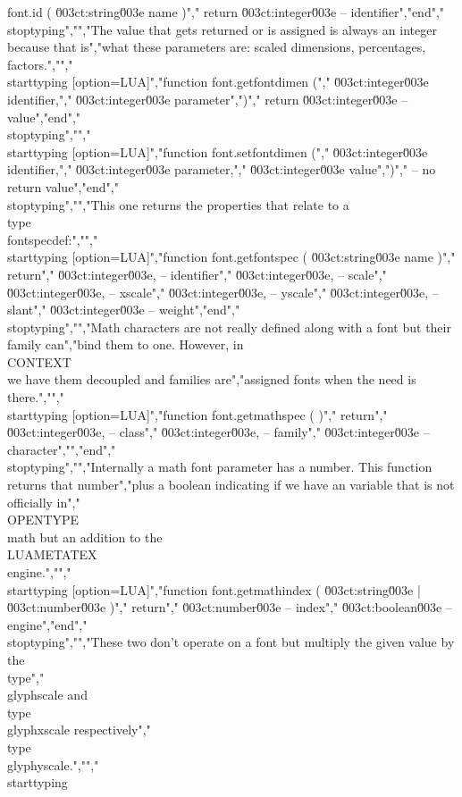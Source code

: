 font.id ( \u003ct:string\u003e name )","    return \u003ct:integer\u003e -- identifier","end","\\stoptyping","","The value that gets returned or is assigned is always an integer because that is","what these parameters are: scaled dimensions, percentages, factors.","","\\starttyping [option=LUA]","function font.getfontdimen (","    \u003ct:integer\u003e identifier,","    \u003ct:integer\u003e parameter",")","    return \u003ct:integer\u003e -- value","end","\\stoptyping","","\\starttyping [option=LUA]","function font.setfontdimen (","    \u003ct:integer\u003e identifier,","    \u003ct:integer\u003e parameter,","    \u003ct:integer\u003e value",")","    -- no return value","end","\\stoptyping","","This one returns the properties that relate to a \\type {\\fontspecdef}:","","\\starttyping [option=LUA]","function font.getfontspec ( \u003ct:string\u003e name )","    return","        \u003ct:integer\u003e, -- identifier","        \u003ct:integer\u003e, -- scale","        \u003ct:integer\u003e, -- xscale","        \u003ct:integer\u003e, -- yscale","        \u003ct:integer\u003e, -- slant","        \u003ct:integer\u003e  -- weight","end","\\stoptyping","","Math characters are not really defined along with a font but their family can","bind them to one. However, in \\CONTEXT\\ we have them decoupled and families are","assigned fonts when the need is there.","","\\starttyping [option=LUA]","function font.getmathspec ( )","    return","        \u003ct:integer\u003e, -- class","        \u003ct:integer\u003e, -- family","        \u003ct:integer\u003e  -- character","","end","\\stoptyping","","Internally a math font parameter has a number. This function returns that number","plus a boolean indicating if we have an variable that is not officially in","\\OPENTYPE\\ math but an addition to the \\LUAMETATEX\\ engine.","","\\starttyping [option=LUA]","function font.getmathindex ( \u003ct:string\u003e | \u003ct:number\u003e )","    return","        \u003ct:number\u003e  -- index","        \u003ct:boolean\u003e -- engine","end","\\stoptyping","","These two don't operate on a font but multiply the given value by the \\type","{\\glyphscale} and \\type {\\glyphxscale} respectively","\\type {\\glyphyscale}.","","\\starttyping 